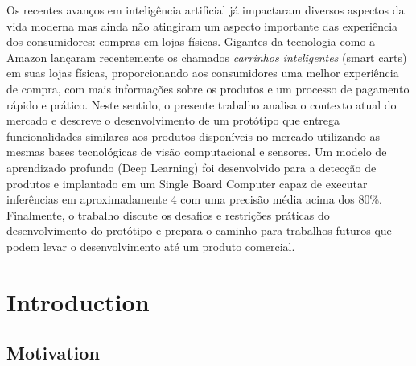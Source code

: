 \documentclass[openright]{normas-utf-tex} %
\begin{document}
\begin{resumo}

Os recentes avanços em inteligência artificial já impactaram diversos aspectos
da vida moderna mas ainda não atingiram um aspecto importante das
experiência dos consumidores: compras em lojas físicas. Gigantes da
tecnologia como a Amazon lançaram recentemente os chamados
\textit{carrinhos inteligentes} (smart carts) em suas lojas físicas,
proporcionando aos consumidores uma melhor experiência de compra, com mais
informações sobre os produtos e um processo de pagamento rápido e prático.
Neste sentido, o presente trabalho analisa o contexto atual do mercado e
descreve o desenvolvimento de um protótipo que entrega funcionalidades
similares aos produtos disponíveis no mercado utilizando as mesmas bases
tecnológicas de visão computacional e sensores. Um modelo de
aprendizado profundo (Deep Learning) foi desenvolvido para a detecção de
produtos e implantado em um Single Board Computer capaz de executar
inferências em aproximadamente 4  com uma
precisão média acima dos 80\%. Finalmente, o trabalho discute os desafios e
restrições práticas do desenvolvimento do protótipo e prepara o caminho
para trabalhos futuros que podem levar o desenvolvimento até um produto
comercial.
\end{resumo}

\listadefiguras %
\listadetabelas %
\listadesiglas %

\sumario %
%
%
%
%

\setcounter{page}{12}

\chapter{Introduction}

\section{Motivation}
\end{document}
